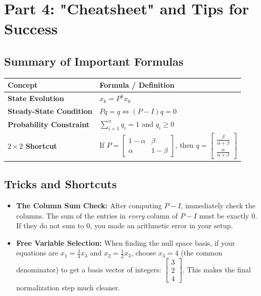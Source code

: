 \documentclass[11pt, letterpaper]{article}
\theoremstyle{definition}
\theoremstyle{remark}
\begin{document}
\newpage
\section{Part 4: "Cheatsheet" and Tips for Success}

\subsection{Summary of Important Formulas}
\renewcommand{\arraystretch}{1.5}
\begin{tabularx}{\textwidth}{>{\hsize=0.3\hsize\bfseries}X >{\hsize=0.7\hsize}X}
\toprule
Concept & Formula / Definition \\
\midrule
State Evolution & $x_k = P^k x_0$ \\
Steady-State Condition & $Pq = q \iff (P - I)q = 0$ \\
Probability Constraint & $\sum_{i=1}^n q_i = 1$ and $q_i \geq 0$ \\
$2 \times 2$ Shortcut & If $P = \begin{bmatrix} 1-\alpha & \beta \\ \alpha & 1-\beta \end{bmatrix}$, then $q = \begin{bmatrix} \frac{\beta}{\alpha+\beta} \\[4pt] \frac{\alpha}{\alpha+\beta} \end{bmatrix}$ \\
\bottomrule
\end{tabularx}

\subsection{Tricks and Shortcuts}
\begin{itemize}
    \item \textbf{The Column Sum Check:} After computing $P-I$, immediately check the columns. The sum of the entries in \textit{every} column of $P-I$ must be exactly $0$. If they do not sum to $0$, you made an arithmetic error in your setup.
    \item \textbf{Free Variable Selection:} When finding the null space basis, if your equations are $x_1 = \frac{3}{4}x_3$ and $x_2 = \frac{1}{2}x_3$, choose $x_3 = 4$ (the common denominator) to get a basis vector of integers: $\begin{bmatrix} 3 \\ 2 \\ 4 \end{bmatrix}$. This makes the final normalization step much cleaner.
\end{itemize}
\end{document}
